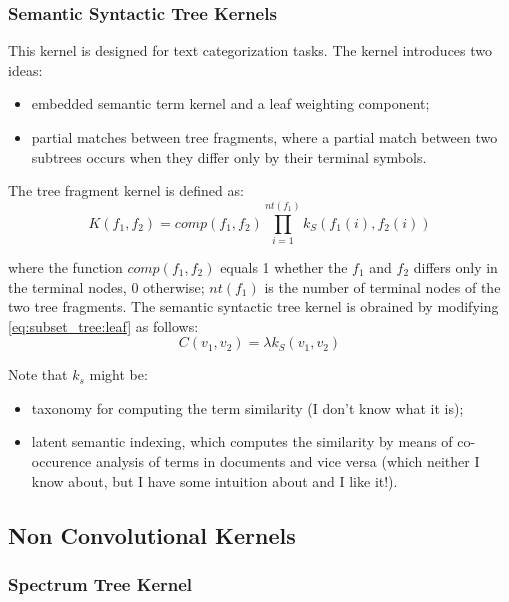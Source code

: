 \subsubsection{Semantic Syntactic Tree Kernels}

This kernel is designed for text categorization tasks. The kernel introduces two
ideas:
\begin{itemize}
	\item embedded semantic term kernel and a leaf weighting component;

	\item partial matches between tree fragments, where a partial match between
	two subtrees occurs when they differ only by their terminal symbols.
\end{itemize}

The tree fragment kernel is defined as:
\begin{equation}
	K(f_1, f_2) = 
	comp(f_1, f_2)
	\prod_{i = 1}^{nt(f_1)} k_S(f_1(i), f_2(i))
\end{equation}

where the function $comp(f_1, f_2)$ equals 1 whether the $f_1$ and $f_2$ differs 
only in the terminal nodes, 0 otherwise; 
$nt(f_1)$  is the number of terminal nodes of the two tree fragments.
The semantic syntactic tree kernel is obrained by modifying
\autoref{eq:subset_tree:leaf} as follows:
\begin{equation}
	C(v_1, v_2) = \lambda k_S(v_1, v_2)
\end{equation}

Note that $k_s$ might be:
\begin{itemize}
	\item taxonomy for computing the term similarity (I don't know what it is);
	\item latent semantic indexing, which computes the similarity by means of
	co-occurence analysis of terms in documents and vice versa (which neither I
	know about, but I have some intuition about and I like it!).
\end{itemize}

\subsection{Non Convolutional Kernels}

\subsubsection{Spectrum Tree Kernel}


